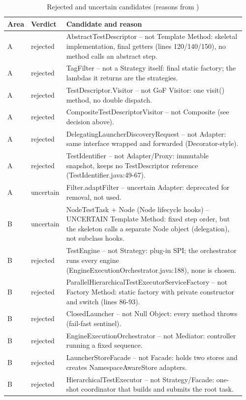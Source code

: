 \documentclass[11pt,a4paper]{article}
\begin{document}
\begin{longtable}{@{}p{0.06\linewidth}p{0.11\linewidth}p{0.79\linewidth}@{}}
\caption{Rejected and uncertain candidates (reasons from \protect{})}\label{tab:rejected}\\\toprule
Area & Verdict & Candidate and reason\\\midrule\endhead
A & rejected & AbstractTestDescriptor -- not Template Method: skeletal implementation, final getters (lines 120/140/150), no method calls an abstract step.\\
A & rejected & TagFilter -- not a Strategy itself: final static factory; the lambdas it returns are the strategies.\\
A & rejected & TestDescriptor.Visitor -- not GoF Visitor: one visit() method, no double dispatch.\\
A & rejected & CompositeTestDescriptorVisitor -- not Composite (see decision above).\\
A & rejected & DelegatingLauncherDiscoveryRequest -- not Adapter: same interface wrapped and forwarded (Decorator-style).\\
A & rejected & TestIdentifier -- not Adapter/Proxy: immutable snapshot, keeps no TestDescriptor reference (TestIdentifier.java:49-67).\\
A & uncertain & Filter.adaptFilter -- uncertain Adapter: deprecated for removal, not used.\\
B & uncertain & NodeTestTask + Node (Node lifecycle hooks) -- UNCERTAIN Template Method: fixed step order, but the skeleton calls a separate Node object (delegation), not subclass hooks.\\
B & rejected & TestEngine -- not Strategy: plug-in SPI; the orchestrator runs every engine (EngineExecutionOrchestrator.java:188), none is chosen.\\
B & rejected & ParallelHierarchicalTestExecutorServiceFactory -- not Factory Method: static factory with private constructor and switch (lines 86-93).\\
B & rejected & ClosedLauncher -- not Null Object: every method throws (fail-fast sentinel).\\
B & rejected & EngineExecutionOrchestrator -- not Mediator: controller running a fixed sequence.\\
B & rejected & LauncherStoreFacade -- not Facade: holds two stores and creates NamespaceAwareStore adapters.\\
B & rejected & HierarchicalTestExecutor -- not Strategy/Facade: one-shot coordinator that builds and submits the root task.\\

\end{longtable}
\end{document}
